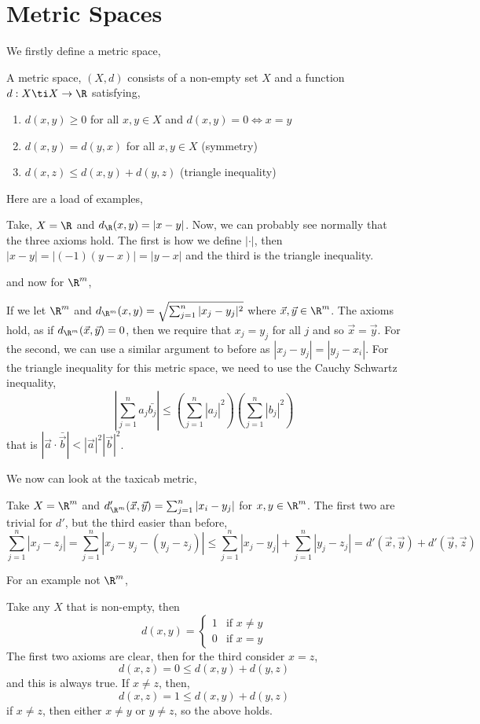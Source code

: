 \section{Metric Spaces}
We firstly define a metric space,
\begin{ndefi}
  A metric space, $(X, d)$ consists of a non-empty set $X$ and a function $d : X \ti X \to \R$ satisfying,
  \begin{enumerate}
    \item $d(x, y) \ge 0$ for all $x, y \in X$ and $d(x, y) = 0 \iff x = y$
    \item $d(x, y) = d(y, x)$ for all $x, y \in X$ (symmetry)
    \item $d(x, z) \le d(x, y) + d(y, z)$ (triangle inequality)
  \end{enumerate}
\end{ndefi}

Here are a load of examples,
\begin{eg}
  Take, $X = \R$ and $d_\R(x, y) = |x - y|$. Now, we can probably see normally that the three axioms hold. The first is how we define $|\cdot|$, then $|x - y| = |(-1)(y - x)| = |y - x|$ and the third is the triangle inequality.
\end{eg}
and now for $\R^m$,
\begin{eg}
  If we let $\R^m$ and $d_{\R^m}(x, y) = \sqrt{\sum_{j=1}^n |x_j - y_j|^2}$ where $\vec x, \vec y  \in \R^m$. The axioms hold, as if $d_{\R^m}(\vec x, \vec y) = 0$, then we require that $x_j = y_j$ for all $j$ and so $\vec x = \vec y$. For the second, we can use a similar argument to before as $|x_j - y_j|= |y_j - x_i|$. For the triangle inequality for this metric space, we need to use the Cauchy Schwartz inequality,
  $$ \left| \sum_{j=1}^n a_j\bar{b_j} \right| \le \left(\sum_{j=1}^n |a_j|^2\right)\left(\sum_{j=1}^n |b_j|^2\right) $$
  that is $|\vec a \cdot \bar{\vec b}| < |\vec a|^2|\vec b|^2$.
\end{eg}

We now can look at the taxicab metric,
\begin{eg}
  Take $X = \R^m$ and $d'_{\R^m}(\vec x, \vec y) = \sum_{j=1}^n |x_{i} - y_j|$ for $x, y \in \R^m$. The first two are trivial for $d'$, but the third easier than before,
  $$ \sum_{j=1}^n |x_j - z_j| = \sum_{j=1}^n |x_j - y_j - (y_j - z_j)| \le \sum_{j=1}^n |x_j - y_j| + \sum_{j=1}^n |y_j - z_j| = d'(\vec x, \vec y) + d'(\vec y, \vec z)$$
\end{eg}
For an example not $\R^m$,
\begin{eg}
  Take any $X$ that is non-empty, then
  $$ d(x, y) = \begin{cases}
    1 & \text{if $x \ne y$}\\
    0 & \text{if $x = y$}
  \end{cases} $$
  The first two axioms are clear, then for the third consider $x = z$,
  $$ d(x, z) = 0 \le d(x, y) + d(y, z) $$
  and this is always true. If $x \ne z$, then,
  $$ d(x, z) = 1 \le d(x, y) + d(y, z) $$
  if $x \ne z$, then either $x \ne y$ or $y \ne z$, so the above holds.
\end{eg}

